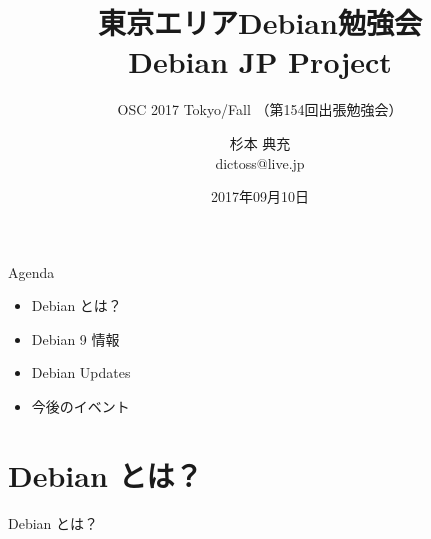 \title{東京エリアDebian勉強会\\Debian JP Project}
\subtitle{OSC 2017 Tokyo/Fall （第154回出張勉強会）}
\author{杉本 典充\\ dictoss@live.jp}
\date{2017年09月10日}



\begin{frame}
\titlepage{}
\end{frame}

\begin{frame}{Agenda}
  \begin{itemize}
  \item Debian とは？
  \item Debian 9 情報
  \item Debian Updates
  \item 今後のイベント
  \end{itemize}
\end{frame}


\section{Debian とは？}
\begin{frame}\begin{center}\Huge{Debian とは？}\end{center}\end{frame}


